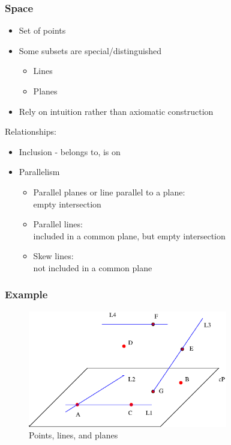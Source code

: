 \begin{frame}
 \frametitle{Space}

  \begin{itemize}
      \item Set of points
      \item Some subsets are special/distinguished
      \begin{itemize}
	  \item Lines
	  \item Planes
      \end{itemize}
      \item Rely on intuition rather than axiomatic construction
  \end{itemize}

\pause

  Relationships:
  \begin{itemize}
   \item Inclusion - belongs to, is on
   \item Parallelism
      \begin{itemize}
	\item Parallel planes or line parallel to a plane: \\
	      empty intersection
	\item Parallel lines: \\
	      included in a common plane, but empty intersection
	\item Skew lines: \\
	      not included in a common plane
      \end{itemize}
  \end{itemize}

\end{frame}

\begin{frame}
\frametitle{Example}

%
\begin{figure}[h]
  \includegraphics[height=2in]{../images/line_plane.eps}
  \caption{Points, lines, and planes}
  \label{fig:points_lines_planes}
\end{figure}
%
\end{frame}


